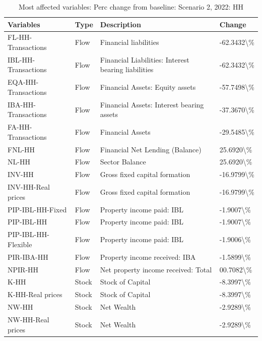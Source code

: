 \documentclass[
]{book}
\begin{document}
\begin{table}

\caption{\label{tab:most-affected-scenario-2-perc-HH}Most affected variables: Perc change from baseline: Scenario 2, 2022: HH}
\centering
\fontsize{10}{12}\selectfont
\begin{tabular}[t]{l|l|l|l}
\hline
Variables & Type & Description & Change\\
\hline
FL-HH-Transactions & Flow & Financial liabilities & -62.3432\textbackslash{}\%\\
\hline
IBL-HH-Transactions & Flow & Financial Liabilities: Interest bearing liabilities & -62.3432\textbackslash{}\%\\
\hline
EQA-HH-Transactions & Flow & Financial Assets: Equity assets & -57.7498\textbackslash{}\%\\
\hline
IBA-HH-Transactions & Flow & Financial Assets: Interest bearing assets & -37.3670\textbackslash{}\%\\
\hline
FA-HH-Transactions & Flow & Financial Assets & -29.5485\textbackslash{}\%\\
\hline
FNL-HH & Flow & Financial Net Lending (Balance) & 25.6920\textbackslash{}\%\\
\hline
NL-HH & Flow & Sector Balance & 25.6920\textbackslash{}\%\\
\hline
INV-HH & Flow & Gross fixed capital formation & -16.9799\textbackslash{}\%\\
\hline
INV-HH-Real prices & Flow & Gross fixed capital formation & -16.9799\textbackslash{}\%\\
\hline
PIP-IBL-HH-Fixed & Flow & Property income paid: IBL & -1.9007\textbackslash{}\%\\
\hline
PIP-IBL-HH & Flow & Property income paid: IBL & -1.9007\textbackslash{}\%\\
\hline
PIP-IBL-HH-Flexible & Flow & Property income paid: IBL & -1.9006\textbackslash{}\%\\
\hline
PIR-IBA-HH & Flow & Property income received: IBA & -1.5899\textbackslash{}\%\\
\hline
NPIR-HH & Flow & Net property income received: Total & 00.7082\textbackslash{}\%\\
\hline
K-HH & Stock & Stock of Capital & -8.3997\textbackslash{}\%\\
\hline
K-HH-Real prices & Stock & Stock of Capital & -8.3997\textbackslash{}\%\\
\hline
NW-HH & Stock & Net Wealth & -2.9289\textbackslash{}\%\\
\hline
NW-HH-Real prices & Stock & Net Wealth & -2.9289\textbackslash{}\%\\

\end{tabular}
\end{table}
\end{document}
